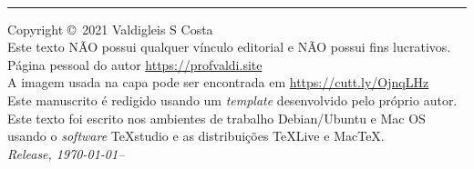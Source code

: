 
\newpage
~\vfill
\thispagestyle{empty}

\hrule
\vspace*{1cm}
\noindent Copyright \copyright\ 2021 Valdigleis S Costa\\ %

\noindent Este texto  \textsc{NÃO}  possui qualquer vínculo editorial e \textsc{NÃO} possui fins lucrativos.\\ %

\noindent Página pessoal do autor \url{https://profvaldi.site}\\ 

\noindent A imagem usada na capa pode ser encontrada em \url{https://cutt.ly/OjnqLHz}\\


\noindent Este manuscrito é redigido usando um \textit{template} desenvolvido pelo próprio autor. Este texto foi escrito nos ambientes de trabalho Debian/Ubuntu e Mac OS usando o \textit{software} TeXstudio e as distribuições TeXLive e MacTeX. \\ 

\noindent \textit{Release, \today--\currenttime} %
\newpage